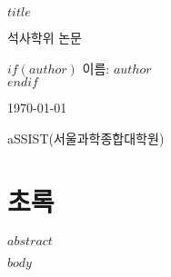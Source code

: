 \documentclass[$if(fontsize)$$fontsize$,$endif$$if(lang)$$lang$,$endif$$if(papersize)$$papersize$,$endif$$for(classoption)$$classoption$$sep$,$endfor$]{$documentclass$}
\begin{document}
\begin{titlepage}
\begin{center}
\vspace*{2cm}

{\Huge\textbf{$title$}}\\

\vspace{1.5cm}

{\LARGE 석사학위 논문}\\

\vspace{2cm}

$if(author)$
{\large 이름: $author$}\\
$endif$

\vspace{3cm}

{\large \today}\\

\vspace{2cm}

{\large aSSIST(서울과학종합대학원)}\\
\end{center}
\end{titlepage}

\chapter*{초록}

$abstract$

\newpage
\tableofcontents
\newpage

\listoffigures
\newpage

\listoftables
\newpage

$body$
\end{document}
